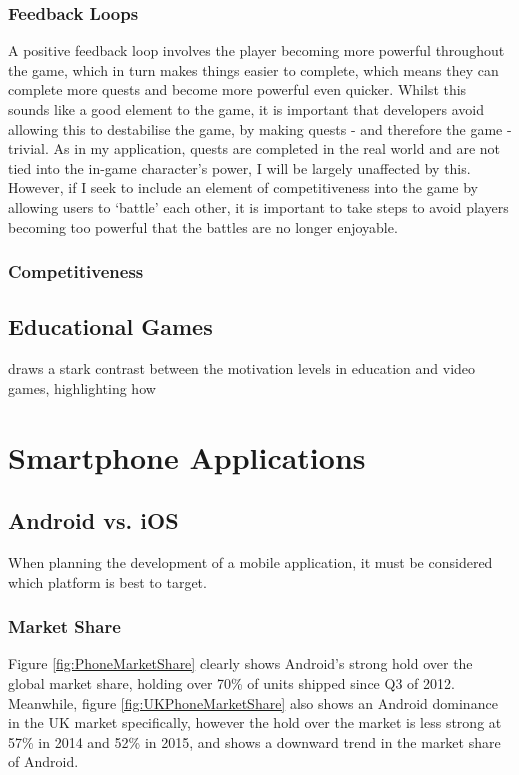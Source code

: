 \subsubsection{Feedback Loops}
A positive feedback loop involves the player becoming more powerful throughout the game, which in turn makes things easier to complete, which means they can complete more quests and become more powerful even quicker.
Whilst this sounds like a good element to the game, it is important that developers avoid allowing this to destabilise the game, by making quests - and therefore the game - trivial.
As in my application, quests are completed in the real world and are not tied into the in-game character's power, I will be largely unaffected by this.
However, if I seek to include an element of competitiveness into the game by allowing users to `battle' each other, it is important to take steps to avoid players becoming too powerful that the battles are no longer enjoyable.

\subsubsection{Competitiveness}

\subsection{Educational Games}
\cite{Denis:2005:MEG:1178477.1178581} draws a stark contrast between the motivation levels in education and video games, highlighting how 	

\section{Smartphone Applications}


\subsection{Android vs. iOS}
When planning the development of a mobile application, it must be considered which platform is best to target. 

\subsubsection{Market Share}
Figure \ref{fig:PhoneMarketShare} clearly shows Android's strong hold over the global market share, holding over 70\% of units shipped since Q3 of 2012. 
Meanwhile, figure \ref{fig:UKPhoneMarketShare} also shows an Android dominance in the UK market specifically, however the hold over the market is less strong at 57\% in 2014 and 52\% in 2015, and shows a downward trend in the market share of Android.

